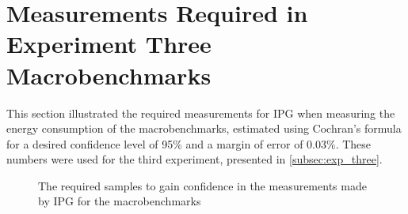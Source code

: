 \section{Measurements Required in Experiment Three Macrobenchmarks}\label{app:exp_three_coch_app}

This section illustrated the required measurements for IPG when measuring the energy consumption of the macrobenchmarks, estimated using Cochran's formula for a desired confidence level of 95\% and a margin of error of 0.03\%. These numbers were used for the third experiment, presented in \cref{subsec:exp_three}.


\begin{figure}[H]
    \centering
    \begin{subfigure}[b]{0.4\textwidth}
        \centering
        
    \end{subfigure}
    \hfill
    \begin{subfigure}[b]{0.4\textwidth}
        \centering
        
    \end{subfigure}
    \caption{The required samples to gain confidence in the measurements made by IPG for the macrobenchmarks}
\end{figure}